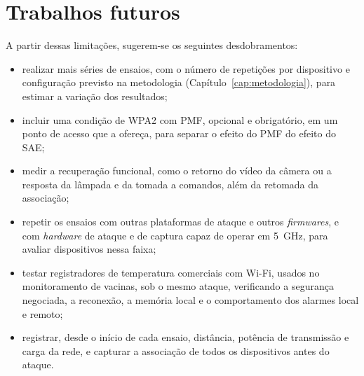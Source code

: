 \section{Trabalhos futuros}

A partir dessas limitações, sugerem-se os seguintes desdobramentos:

\begin{itemize}
    \item realizar mais séries de ensaios, com o número de repetições por dispositivo e configuração previsto na metodologia (Capítulo~\ref{cap:metodologia}), para estimar a variação dos resultados;
    \item incluir uma condição de WPA2 com PMF, opcional e obrigatório, em um ponto de acesso que a ofereça, para separar o efeito do PMF do efeito do SAE;
    \item medir a recuperação funcional, como o retorno do vídeo da câmera ou a resposta da lâmpada e da tomada a comandos, além da retomada da associação;
    \item repetir os ensaios com outras plataformas de ataque e outros \textit{firmwares}, e com \textit{hardware} de ataque e de captura capaz de operar em 5~GHz, para avaliar dispositivos nessa faixa;
    \item testar registradores de temperatura comerciais com Wi-Fi, usados no monitoramento de vacinas, sob o mesmo ataque, verificando a segurança negociada, a reconexão, a memória local e o comportamento dos alarmes local e remoto;
    \item registrar, desde o início de cada ensaio, distância, potência de transmissão e carga da rede, e capturar a associação de todos os dispositivos antes do ataque.
\end{itemize}
